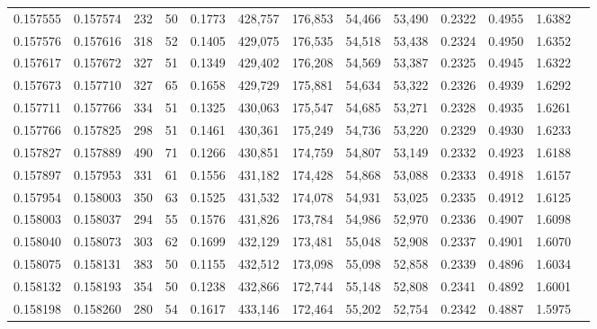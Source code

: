 \begin{tabular}{rrrrrrrrrrrrr}
0.157555 & 0.157574 &   232 &  50 &                                     0.1773 & 428,757 & 176,853 &  54,466 &  53,490 & 0.2322 & 0.4955 & 1.6382 \\
0.157576 & 0.157616 &   318 &  52 &                                     0.1405 & 429,075 & 176,535 &  54,518 &  53,438 & 0.2324 & 0.4950 & 1.6352 \\
0.157617 & 0.157672 &   327 &  51 &                                     0.1349 & 429,402 & 176,208 &  54,569 &  53,387 & 0.2325 & 0.4945 & 1.6322 \\
0.157673 & 0.157710 &   327 &  65 &                                     0.1658 & 429,729 & 175,881 &  54,634 &  53,322 & 0.2326 & 0.4939 & 1.6292 \\
0.157711 & 0.157766 &   334 &  51 &                                     0.1325 & 430,063 & 175,547 &  54,685 &  53,271 & 0.2328 & 0.4935 & 1.6261 \\
0.157766 & 0.157825 &   298 &  51 &                                     0.1461 & 430,361 & 175,249 &  54,736 &  53,220 & 0.2329 & 0.4930 & 1.6233 \\
0.157827 & 0.157889 &   490 &  71 &                                     0.1266 & 430,851 & 174,759 &  54,807 &  53,149 & 0.2332 & 0.4923 & 1.6188 \\
0.157897 & 0.157953 &   331 &  61 &                                     0.1556 & 431,182 & 174,428 &  54,868 &  53,088 & 0.2333 & 0.4918 & 1.6157 \\
0.157954 & 0.158003 &   350 &  63 &                                     0.1525 & 431,532 & 174,078 &  54,931 &  53,025 & 0.2335 & 0.4912 & 1.6125 \\
0.158003 & 0.158037 &   294 &  55 &                                     0.1576 & 431,826 & 173,784 &  54,986 &  52,970 & 0.2336 & 0.4907 & 1.6098 \\
0.158040 & 0.158073 &   303 &  62 &                                     0.1699 & 432,129 & 173,481 &  55,048 &  52,908 & 0.2337 & 0.4901 & 1.6070 \\
0.158075 & 0.158131 &   383 &  50 &                                     0.1155 & 432,512 & 173,098 &  55,098 &  52,858 & 0.2339 & 0.4896 & 1.6034 \\
0.158132 & 0.158193 &   354 &  50 &                                     0.1238 & 432,866 & 172,744 &  55,148 &  52,808 & 0.2341 & 0.4892 & 1.6001 \\
0.158198 & 0.158260 &   280 &  54 &                                     0.1617 & 433,146 & 172,464 &  55,202 &  52,754 & 0.2342 & 0.4887 & 1.5975 \\

\end{tabular}
